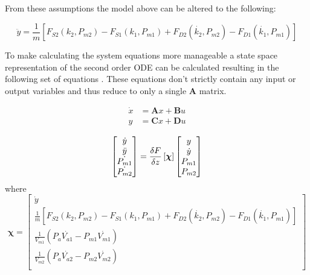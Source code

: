 \documentclass[11pt,a4paper]{article}
\begin{document}
From these assumptions the model  above can be altered to the following:

\begin{equation}
    \ddot{y} = \frac{1}{m}[F_{S2}(k_2,P_{m2})-F_{S1}(k_1,P_{m1})+F_{D2}(\dot{k_2},P_{m2})-F_{D1}(\dot{k_1},P_{m1})]
    \label{math:two_muscle_ode}
\end{equation}

To make calculating the system equations more manageable a state space representation  of the second order ODE can be calculated resulting in the following set of equations . These equations don't strictly contain any input or output variables and thus reduce to only a single $\boldsymbol{A}$ matrix.


\begin{align}
    \label{math:state_space_representation}
    \dot{x} &= \boldsymbol{A}x + \boldsymbol{B}u\\
    y &= \boldsymbol{C}x + \boldsymbol{D}u\nonumber 
\end{align}


\begin{equation}
\begin{bmatrix}
        \dot{y}\\
        \ddot{y}\\
        \dot{P_{m1}}\\
        \dot{P_{m2}}\\
    \end{bmatrix}
    = \fdv{F}{z}\left[\boldsymbol{\chi}\right]
    \begin{bmatrix}
        y\\
        \dot{y}\\
        P_{m1}\\
        P_{m2}\\
    \end{bmatrix}
    \label{math:state_space_matrix}
\end{equation}
where
\begin{equation*}
        \boldsymbol{\chi} = 
    \begin{bmatrix}
        \dot{y}\\
        \frac{1}{m}[F_{S2}(k_2,P_{m2})-F_{S1}(k_1,P_{m1})+F_{D2}(\dot{k_2},P_{m2})-F_{D1}(\dot{k_1},P_{m1})]\\
        \frac{1}{V_{m1}}(P_a\dot{V_{a1}}-P_{m1}\dot{V_{m1}})\\
        \frac{1}{V_{m2}}(P_a\dot{V_{a2}}-P_{m2}\dot{V_{m2}})\\
    \end{bmatrix}
\end{equation*}
\end{document}

